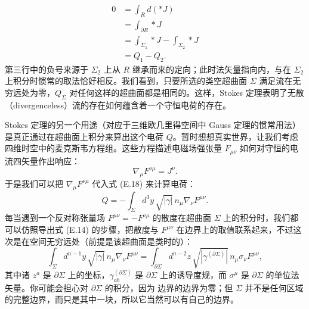 
\begin{align*}
0 &= \int_R d(*J) \\
&= \int_{\partial R} *J \\
&= \int_{\Sigma_1} *J - \int_{\Sigma_2} *J \\
&= Q_1 - Q_2.
\tag{E.19}
\end{align*}
第三行中的负号来源于 $\Sigma_2$ 上从 $R$ 继承而来的定向；此时法矢量指向内，与在 $\Sigma_2$ 上积分时惯常的取法恰好相反。我们看到，只要所选的类空超曲面 $\Sigma$ 满足流在无穷远处为零，$Q_\Sigma$ 对任何这样的超曲面都是相同的。这样，Stokes 定理表明了无散（divergenceless）流的存在如何蕴含着一个守恒电荷的存在。

Stokes 定理的另一个用途（对应于三维欧几里得空间中 Gauss 定理的惯常用法）是真正通过在超曲面上积分来算出这个电荷 $Q$。暂时想想真实世界，让我们考虑四维时空中的麦克斯韦方程组。这些方程描述电磁场强张量 $F_{\mu\nu}$ 如何对守恒的电流四矢量作出响应：
\begin{equation*}
\nabla_\mu F^{\nu\mu} = J^\nu.
\tag{E.20}
\end{equation*}
于是我们可以把 $\nabla_\mu F^{\nu\mu}$ 代入式 (E.18) 来计算电荷：
\begin{equation*}
Q = -\int_\Sigma d^3y\,\sqrt{|\gamma|}\,n_\mu\nabla_\nu F^{\mu\nu}.
\tag{E.21}
\end{equation*}
每当遇到一个反对称张量场 $F^{\mu\nu} = -F^{\nu\mu}$ 的散度在超曲面 $\Sigma$ 上的积分时，我们都可以仿照导出式 (E.14) 的步骤，把散度与 $F^{\mu\nu}$ 在边界上的取值联系起来，不过这次是在空间无穷远处（前提是该超曲面是类时的）：
\begin{equation*}
\boxed{\int_\Sigma d^{n-1}y\,\sqrt{|\gamma|}\,n_\mu\nabla_\nu F^{\mu\nu} = \int_{\partial\Sigma} d^{n-2}z\,\sqrt{|\gamma^{(\partial\Sigma)}|}\,n_\mu\sigma_\nu F^{\mu\nu},}
\tag{E.22}
\end{equation*}
其中诸 $z^a$ 是 $\partial\Sigma$ 上的坐标，$\gamma^{(\partial\Sigma)}_{ab}$ 是 $\partial\Sigma$ 上的诱导度规，而 $\sigma^\mu$ 是 $\partial\Sigma$ 的单位法矢量。你可能会担心对 $\partial\Sigma$ 的积分，因为%
边界的边界为零；但 $\Sigma$ 并不是任何区域的完整边界，而只是其中一块，所以它当然可以有自己的边界。

